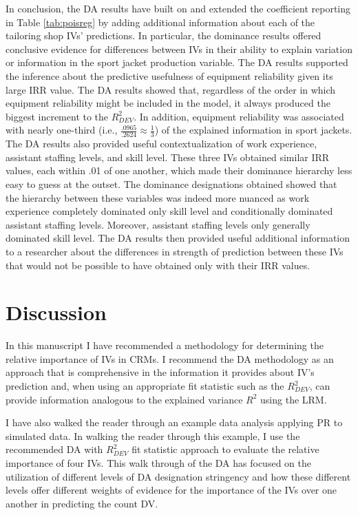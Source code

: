 \documentclass[man]{apa7}
\begin{document}
	In conclusion, the DA results have built on and extended the coefficient reporting in Table \ref{tab:poisreg} by adding additional information about each of the tailoring shop IVs' predictions.
	In particular, the dominance results offered conclusive evidence for differences between IVs in their ability to explain variation or information in the sport jacket production variable. 
	The DA results supported the inference about the predictive usefulness of equipment reliability given its large IRR value. 
	The DA results showed that, regardless of the order in which equipment reliability might be included in the model, it always produced the biggest increment to the $R^2_{DEV}$. 
	In addition, equipment reliability was associated with nearly one-third (i.e., $\frac{.0965}{.2624} \approx \frac{1}{3}$) of the explained information in sport jackets.
	The DA results also provided useful contextualization of work experience, assistant staffing levels, and skill level.
	These three IVs obtained similar IRR values, each within .01 of one another, which made their dominance hierarchy less easy to guess at the outset.
	The dominance designations obtained showed that the hierarchy between these variables was indeed more nuanced as work experience completely dominated only skill level and conditionally dominated assistant staffing levels. 
	Moreover, assistant staffing levels only generally dominated skill level.
	The DA results then provided useful additional information to a researcher about the differences in strength of prediction between these IVs that would not be possible to have obtained only with their IRR values.
	
\section{Discussion}

	In this manuscript I have recommended a methodology for determining the relative importance of IVs in CRMs.
	I recommend the DA methodology as an approach that is comprehensive in the information it provides about IV's prediction and, when using an appropriate fit statistic such as the $R^2_{DEV}$, can provide information analogous to the explained variance $R^2$ using the LRM.
	
	I have also walked the reader through an example data analysis applying PR to simulated data. 
	In walking the reader through this example, I use the recommended DA with $R^2_{DEV}$ fit statistic approach to evaluate the relative importance of four IVs.
	This walk through of the DA has focused on the utilization of different levels of DA designation stringency and how these different levels offer different weights of evidence for the importance of the IVs over one another in predicting the count DV.
	
\end{document}
